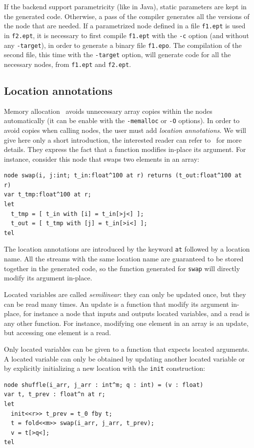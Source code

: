 \documentclass[a4paper]{article}
\begin{document}
If the backend support parametricity (like in Java), static parameters are kept in the generated code. Otherwise, a pass of the compiler generates all the versions of the node that are needed. If a parametrized node defined in a file \texttt{f1.ept} is used in \texttt{f2.ept}, it is necessary to first compile \texttt{f1.ept} with the \texttt{-c} option (and without any \texttt{-target}), in order to generate a binary file \texttt{f1.epo}. The compilation of the second file, this time with the \texttt{-target} option, will generate code for all the necessary nodes, from \texttt{f1.ept} and \texttt{f2.ept}.

\subsection{Location annotations}

Memory allocation~\cite{Gerard:2012} avoids unnecessary array copies within the nodes automatically (it can be enable with the \texttt{-memalloc} or \texttt{-O} options). In order to avoid copies when calling nodes, the user must add \emph{location annotations}. We will give here only a short introduction, the interested reader can refer to~\cite{Gerard:2012} for more details. They express the fact that a function modifies in-place its argument. For instance, consider this node that swaps two elements in an array:
\begin{lstlisting}
node swap(i, j:int; t_in:float^100 at r) returns (t_out:float^100 at r)
var t_tmp:float^100 at r; 
let
  t_tmp = [ t_in with [i] = t_in[>j<] ]; 
  t_out = [ t_tmp with [j] = t_in[>i<] ];
tel
\end{lstlisting}
The location annotations are introduced by the keyword \lstinline{at} followed by a location name. All the streams with the same location name are guaranteed to be stored together in the generated code, so the function generated for \texttt{swap} will directly modify its argument in-place. 

Located variables are called \emph{semilinear}: they can only be updated once, but they can be read many times. An update is a function that modify its argument in-place, for instance a node that inputs and outputs located variables, and a read is any other function. For instance, modifying one element in an array is an update, but accessing one element is a read.

Only located variables can be given to a function that expects located arguments. A located variable can only be obtained by updating another located variable or by explicitly initializing a new location with the \lstinline+init+ construction:
\begin{lstlisting}
node shuffle(i_arr, j_arr : int^m; q : int) = (v : float)
var t, t_prev : float^n at r;
let
  init<<r>> t_prev = t_0 fby t;
  t = fold<<m>> swap(i_arr, j_arr, t_prev); 
  v = t[>q<];
tel
\end{lstlisting}
\end{document}
